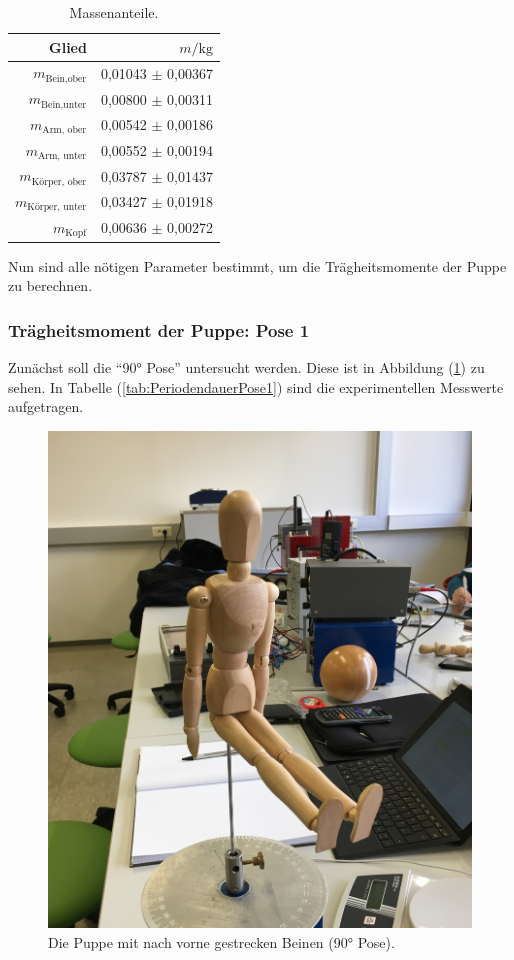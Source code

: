 \begin{table}
  \centering
  \caption{Massenanteile.}
  \label{tab:Massenanteile}
  \begin{tabular}{rr}
  \toprule
  Glied & $m / \unit{\kilo\gram}$ \\
  \midrule
  $m_{\text{Bein,ober}}$      & 0,01043 $\pm$ 0,00367 \\
  $m_{\text{Bein,unter}}$     & 0,00800 $\pm$ 0,00311 \\
  $m_{\text{Arm, ober}}$      & 0,00542 $\pm$ 0,00186 \\
  $m_{\text{Arm, unter}}$     & 0,00552 $\pm$ 0,00194 \\
  $m_{\text{Körper, ober}}$   & 0,03787 $\pm$ 0,01437 \\
  $m_{\text{Körper, unter}}$  & 0,03427 $\pm$ 0,01918 \\
  $m_{\text{Kopf}}$           & 0,00636 $\pm$ 0,00272 \\
  \bottomrule
\end{tabular}
\end{table}


Nun sind alle nötigen Parameter bestimmt, um die Trägheitsmomente der Puppe zu berechnen.

\subsubsection{Trägheitsmoment der Puppe: Pose 1}
Zunächst soll die \enquote{90° Pose} untersucht werden.
Diese ist in Abbildung (\ref{fig:pose1}) zu sehen.
In Tabelle (\ref{tab:PeriodendauerPose1}) sind die experimentellen Messwerte aufgetragen.


\begin{figure}[H]
  \centering
  \includegraphics[width=0.3\columnwidth]{pictures/puppe_rechter_winkel.jpg}
  \caption{Die Puppe mit nach vorne gestrecken Beinen (90° Pose).}
  \label{fig:pose1}
\end{figure}

